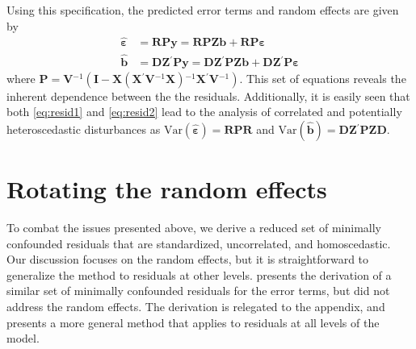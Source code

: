 \documentclass{article} %
\newcommand{\al}[1]{{\color{red} #1}}
\newcommand{\inv}{\ensuremath{^{-1}}}
\newcommand{\trans}{\ensuremath{^\prime}}
\newcommand{\var}{\ensuremath{\mathrm{Var}}}
\begin{document}
Using this specification, the predicted error terms and random effects are given by 
%
\begin{align}
\widehat{\bm{\varepsilon}} &= \bm{RPy} = \bm{RPZb} + \bm{RP \varepsilon} \label{eq:resid1}\\
\widehat{\bm{b}} &= \bm{DZ}\trans \bm{Py} = \bm{DZ}\trans \bm{PZb} + \bm{DZ}\trans \bm{P \varepsilon} \label{eq:resid2}
\end{align}
%
where $\bm{P} = \bm{V}\inv( \bm{I} - \bm{X} (\bm{X}\trans \bm{V}\inv \bm{X})\inv \bm{X}\trans \bm{V}\inv)$. This  set of equations %
reveals the inherent dependence between the the residuals.
Additionally, it is easily seen that both \eqref{eq:resid1} and \eqref{eq:resid2} lead to the analysis of correlated and potentially heteroscedastic disturbances as $\var(\widehat{\bm{\varepsilon}}) = \bm{RPR}$ and $\var(\widehat{\bm{b}}) = \bm{DZ}\trans \bm{PZD}$.



\section{Rotating the random effects}\label{sec:rotate}

To combat the issues presented above, we derive a reduced set of minimally confounded residuals that are standardized, uncorrelated, and homoscedastic. \al{Our discussion focuses on the random effects, but it is straightforward to generalize the method to residuals at other levels.} \cite{HildenMinton:1995wh} presents the derivation of a similar set of minimally confounded residuals for the error terms, but did not address the random effects. The derivation is relegated to the appendix, and presents a more general method that applies to residuals at all levels of the model.
\end{document}

